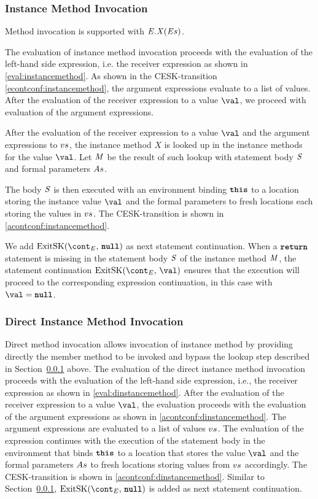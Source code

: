 \documentclass[a4paper,oneside,fleqn]{article}
\newcommand{\synt}[1]{\ensuremath{\text{\textbf{\texttt{#1}}}}}
\DeclareMathOperator{\nnull}{\synt{null}}
\DeclareMathOperator{\return}{\synt{return}}
\newcommand{\this}{\synt{this}}
\newcommand{\idmeta}{\ensuremath{\mathit{X}}}
\begin{document}
\subsubsection{Instance Method Invocation}
\label{subsubsec:instance-method-invoc}

Method invocation is supported with $\InstanceMethodInvocation{\expressionmeta}{\idmeta}{\expressionsmeta}$.

The evaluation of instance method invocation proceeds with the evaluation of the left-hand side expression, i.e. the receiver expression as shown in \eqref{eval:instancemethod}.
As shown in the CESK-transition \eqref{econtconf:instancemethod}, the argument expressions evaluate to a list of values.
After the evaluation of the receiver expression to a value $\val$, we proceed with evaluation of the argument expressions.

After the evaluation of the receiver expression to a value $\val$ and the argument expressions to $vs$, the instance method $\idmeta$ is looked up in the instance methods for the value $\val$.
Let $\mathit{M}$ be the result of such lookup with statement body $\mathit{S}$ and formal parameters $As$.

The body $\mathit{S}$ is then executed with an environment binding $\this$ to a location storing the instance value $\val$ and the formal parameters to fresh locations each storing the values in $vs$.
The CESK-transition is shown in \eqref{acontconf:instancemethod}.

We add $\ExitSK{\nnull}$ as next statement continuation.
When a $\return$ statement is missing in the statement body $\mathit{S}$ of the instance method $\mathit{M}$, the statement continuation $\ExitSK{\val}$ ensures that the execution will proceed to the corresponding expression continuation, in this case with $\val = \nnull$.


\subsubsection{Direct Instance Method Invocation}
\label{subsubsec:direct-instance-method-invoc}

Direct method invocation allows invocation of instance method by providing directly the member method to be invoked and bypass the lookup step described in Section~\ref{subsubsec:instance-method-invoc} above.
The evaluation of the direct instance method invocation proceeds with the evaluation of the left-hand side expression, i.e., the receiver expression as shown in \eqref{eval:dinstancemethod}.
After the evaluation of the receiver expression to a value $\val$, the evaluation proceeds with the evaluation of the argument expressions as shown in \eqref{acontconf:dinstancemethod}.
The argument expressions are evaluated to a list of values $vs$.
The evaluation of the expression continues with the execution of the statement body in the environment that binds $\this$ to a location that stores the value $\val$ and the formal parameters $As$ to fresh locations storing values from $vs$ accordingly.
The CESK-transition is shown in \eqref{acontconf:dinstancemethod}.
Similar to Section~\ref{subsubsec:instance-method-invoc}, $\ExitSK{\nnull}$ is added as next statement continuation.
\end{document}
